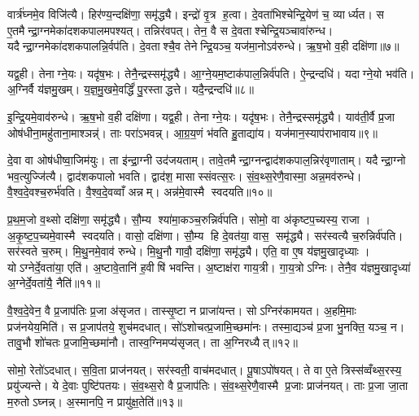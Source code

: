 वार्त्र॑घ्नमे॒व विजि॑त्यै। हिर॑ण्य॒न्दक्षि॑णा॒ समृ॑द्ध्यै। इन्द्रो॑ वृ॒त्र ह॒त्वा। दे॒वता॑भिश्चेन्द्रि॒येण॑ च॒ व्यार्ध्यत। स ए॒तमैन्द्रा॒ग्नमेका॑दशकपालमपश्यत्। तन्निर॑वपत्। तेन॒ वै स दे॒वताश्चेन्द्रि॒यञ्चावा॑रुन्ध। यदैन्द्रा॒ग्नमेका॑दशकपालन्नि॒र्वप॑ति। दे॒वताश्चै॒व तेनेन्द्रि॒यञ्च॒ यज॑मा॒नोऽव॑रुन्धे। ऋ॒ष॒भो व॒ही दक्षि॑णा॥७॥

यद्व॒ही। तेनाग्ने॒यः। यदृ॑ष॒भः। तेनै॒न्द्रस्समृ॑द्ध्यै। आ॒ग्ने॒यम॒ष्टाक॑पाल॒न्निर्व॑पति। ऐ॒न्द्रन्दधि॑। यदाग्ने॒यो भव॑ति। अ॒ग्निर्वै य॑ज्ञमु॒खम्। य॒ज्ञ॒मु॒खमे॒वर्द्धिं॑ पु॒रस्ताद्धत्ते। यदै॒न्द्रन्दधि॑॥८॥

इ॒न्द्रि॒यमे॒वाव॑रुन्धे। ऋ॒ष॒भो व॒ही दक्षि॑णा। यद्व॒ही। तेनाग्ने॒यः। यदृ॑ष॒भः। तेनै॒न्द्रस्समृ॑द्ध्यै। याव॑ती॒र्वै प्र॒जा ओष॑धीना॒महु॑ताना॒माश्ञन्न्॑। ताः परा॑ऽभवन्न्। आ॒ग्र॒य॒णं भ॑वति हु॒ताद्या॑य। यज॑मान॒स्याप॑राभावाय॥९॥

दे॒वा वा ओष॑धीष्वा॒जिम॑युः। ता इ॑न्द्रा॒ग्नी उद॑जयताम्। तावे॒तमैन्द्रा॒ग्नन्द्वाद॑शकपाल॒न्निर॑वृणाताम्। यदैन्द्रा॒ग्नो भव॒त्युज्जि॑त्यै। द्वाद॑शकपालो भवति। द्वाद॑श॒ मासास्संवत्स॒रः। सं॒व॒थ्स॒रेणै॒वास्मा॒ अन्न॒मव॑रुन्धे। वै॒श्व॒दे॒वश्च॒रुर्भ॑वति। वै॒श्व॒दे॒वव्वाँ अन्नम्। अन्न॑मे॒वास्मै स्वदयति॥१०॥

प्र॒थ॒म॒जो व॒थ्सो दक्षि॑णा॒ समृ॑द्ध्यै। सौ॒म्य श्या॑मा॒कञ्च॒रुन्निर्व॑पति। सोमो॒ वा अ॑कृष्टप॒च्यस्य॒ राजा। अ॒कृ॒ष्ट॒प॒च्यमे॒वास्मै स्वदयति। वासो॒ दक्षि॑णा। सौ॒म्य हि दे॒वत॑या॒ वास॒ समृ॑द्ध्यै। सर॑स्वत्यै च॒रुन्निर्व॑पति। सर॑स्वते च॒रुम्। मि॒थु॒नमे॒वाव॑ रुन्धे। मि॒थु॒नौ गावौ॒ दक्षि॑णा॒ समृ॑द्ध्यै। एति॒ वा ए॒ष य॑ज्ञमु॒खादृध्याः। योऽग्नेर्दे॒वता॑या॒ एति॑। अ॒ष्टावे॒तानि॑ ह॒वीषि॑ भवन्ति। अ॒ष्टाक्ष॑रा गाय॒त्री। गा॒य॒त्रोऽग्निः। तेनै॒व य॑ज्ञमु॒खादृध्या॑ अ॒ग्नेर्दे॒वता॑यै॒ नैति॑॥११॥

वै॒श्व॒दे॒वेन॒ वै प्र॒जाप॑तिः प्र॒जा अ॑सृजत। तास्सृ॒ष्टा न प्राजा॑यन्त। सोऽग्निर॑कामयत। अ॒हमि॒माः प्रज॑नयेय॒मिति॑। स प्र॒जाप॑तये॒ शुच॑मदधात्। सो॑ऽशोचत्प्र॒जामि॒च्छमा॑नः। तस्मा॒द्यञ्च॑ प्र॒जा भु॒नक्ति॒ यञ्च॒ न। तावु॒भौ शो॑चतः प्र॒जामि॒च्छमा॑नौ। तास्व॒ग्निमप्य॑सृजत्। ता अ॒ग्निरध्यैत्॥१२॥

सोमो॒ रेतो॑ऽदधात्। स॒वि॒ता प्राज॑नयत्। सर॑स्वती॒ वाच॑मदधात्। पू॒षाऽपो॑षयत्। ते वा ए॒ते त्रिस्स॑व्वँथ्स॒रस्य॒ प्रयु॑ज्यन्ते। ये दे॒वाः पुष्टि॑पतयः। सं॒व॒थ्स॒रो वै प्र॒जाप॑तिः। सं॒व॒थ्स॒रेणै॒वास्मै प्र॒जाः प्राज॑नयत्। ताः प्र॒जा जा॒ता म॒रुतोऽघ्नन्न्। अ॒स्मानपि॒ न प्रायु॑क्ष॒तेति॑॥१३॥

